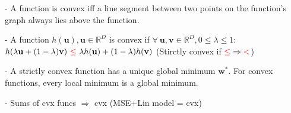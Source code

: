 



- A function is convex iff a line segment between two points on the function’s graph always lies above the function.

- A function $h(\mathbf{u}), \mathbf{u} \in \mathbb{R}^D$ is convex if $\forall \ \mathbf{u}, \mathbf{v} \in \mathbb{R}^D, 0 \leq \lambda \leq  1$: \\ $h(\lambda\mathbf{u}+(1-\lambda)\mathbf{v}) \ \textcolor[RGB]{255,0,0}{\leq} \ \lambda h(\mathbf{u})+(1-\lambda)h(\mathbf{v})$ (Stirctly convex if $\textcolor[RGB]{255,0,0}{\leq} \Rightarrow \textcolor[RGB]{255,0,0}{<}$)

- A strictly convex function has a unique global minimum $\mathbf{w^{*}}$. For convex functions, every local minimum is a global minimum.

- Sums of cvx funcs $\Rightarrow$ cvx (MSE+Lin model = cvx)



